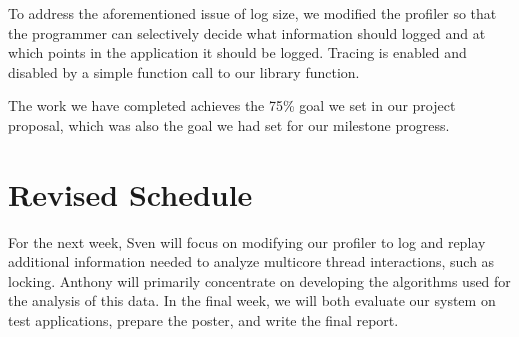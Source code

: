 \documentclass{article}
\begin{document}
To address the aforementioned issue of log size, we modified the
profiler so that the programmer can selectively decide what
information should logged and at which points in the application
it should be logged.  Tracing is enabled
and disabled by a simple function call to our library function.

The work we have completed achieves the 75\% goal we set in our
project proposal, which was also the goal we had set for our
milestone progress.

\section{Revised Schedule}
For the next week, Sven will focus on modifying our profiler
to log and replay additional information needed to analyze multicore
thread interactions, such as locking.  Anthony will primarily
concentrate on developing the algorithms used for the analysis of
this data.   In the final week, we will both evaluate our system
on test applications, prepare the poster, and write the final
report.



\end{document}
